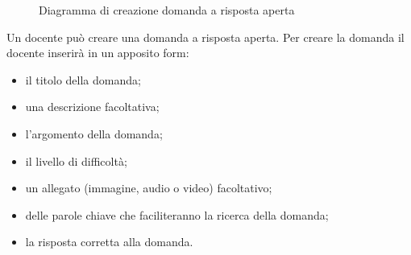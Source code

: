 \documentclass[a4paper, titlepage]{article}
\begin{document}
\newpage
{}
\begin{figure}[H]
	\centering
	\noindent{}
	\caption{Diagramma di creazione domanda a risposta aperta}
\end{figure}
Un docente può creare una domanda a risposta aperta. Per creare la domanda il docente inserirà in un apposito form:
\begin{itemize}
	\item il titolo della domanda;
	\item una descrizione facoltativa;
	\item l'argomento della domanda;
	\item il livello di difficoltà;
	\item un allegato (immagine, audio o video) facoltativo;
	\item delle parole chiave che faciliteranno la ricerca della domanda;
	\item la risposta corretta alla domanda.
\end{itemize}
\end{document}

